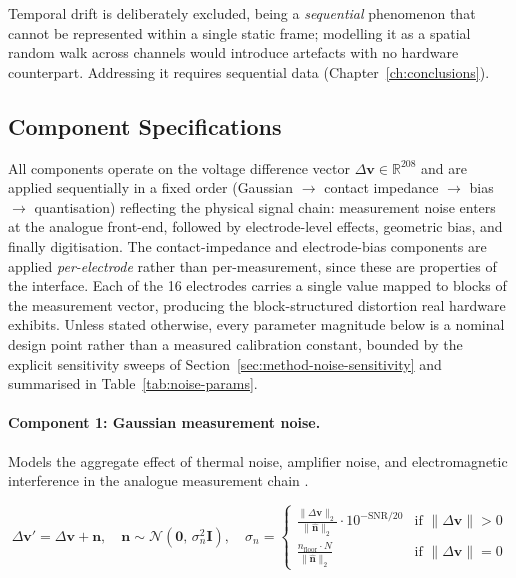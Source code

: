 Temporal drift is deliberately excluded, being a \emph{sequential} phenomenon that cannot be represented within a single static frame; modelling it as a spatial random walk across channels would introduce artefacts with no hardware counterpart. Addressing it requires sequential data (Chapter~\ref{ch:conclusions}).

\subsection{Component Specifications}
\label{sec:method-noise-components}

All components operate on the voltage difference vector $\Delta\mathbf{v} \in \mathbb{R}^{208}$ and are applied sequentially in a fixed order (Gaussian $\to$ contact impedance $\to$ bias $\to$ quantisation) reflecting the physical signal chain: measurement noise enters at the analogue front-end, followed by electrode-level effects, geometric bias, and finally digitisation. The contact-impedance and electrode-bias components are applied \emph{per-electrode} rather than per-measurement, since these are properties of the interface. Each of the 16 electrodes carries a single value mapped to blocks of the measurement vector, producing the block-structured distortion real hardware exhibits. Unless stated otherwise, every parameter magnitude below is a nominal design point rather than a measured calibration constant, bounded by the explicit sensitivity sweeps of Section~\ref{sec:method-noise-sensitivity} and summarised in Table~\ref{tab:noise-params}.

\paragraph{Component 1: Gaussian measurement noise.} Models the aggregate effect of thermal noise, amplifier noise, and electromagnetic interference in the analogue measurement chain \parencite{adler2006, boone1996}.

\begin{equation}
\Delta\mathbf{v}' = \Delta\mathbf{v} + \mathbf{n}, \quad \mathbf{n} \sim \mathcal{N}(\mathbf{0},\, \sigma_n^2 \mathbf{I}), \quad \sigma_n = \begin{cases} \frac{\|\Delta\mathbf{v}\|_2}{\|\hat{\mathbf{n}}\|_2} \cdot 10^{-\text{SNR}/20} & \text{if } \|\Delta\mathbf{v}\| > 0 \\ \frac{n_{\text{floor}} \cdot N}{\|\hat{\mathbf{n}}\|_2} & \text{if } \|\Delta\mathbf{v}\| = 0 \end{cases}
\label{eq:noise-gaussian}
\end{equation}

